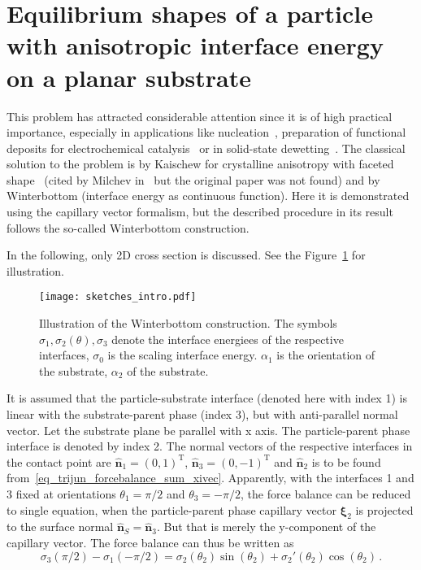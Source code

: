 \section{Equilibrium shapes of a particle with anisotropic interface energy on a planar substrate}
This problem has attracted considerable attention since it is of high practical importance, especially in applications like nucleation~\cite{Bormashenko2021}, preparation of functional deposits for electrochemical catalysis~\cite{Tian2007} or in solid-state dewetting~\cite{PierreLuis2016, Bao2017}. The classical solution to the problem is by Kaischew for crystalline anisotropy with faceted shape~\cite{Kaischew1951} (cited by Milchev in~\cite{Milchev2002} but the original paper was not found) and by Winterbottom \cite{Winterbottom1967} (interface energy as continuous function). Here it is demonstrated using the capillary vector formalism, but the described procedure in its result follows the so-called Winterbottom construction. 

In the following, only 2D cross section is discussed. See the Figure~\ref{fig_winterbottom_explained_intro} for illustration.
\begin{figure}
	\centering
	\texttt{[image: sketches\_intro.pdf]}
	\caption{Illustration of the Winterbottom construction. The symbols $\sigma_1, \sigma_2(\theta), \sigma_3$ denote the interface energiees of the respective interfaces, $\sigma_0$ is the scaling interface energy.  $\alpha_1$ is the orientation of the substrate, $\alpha_2$ of the substrate.}
	\label{fig_winterbottom_explained_intro}
\end{figure}
 It is assumed that the particle-substrate interface (denoted here with index 1) is linear with the substrate-parent phase (index 3), but with anti-parallel normal vector. Let the substrate plane be parallel with x axis. The particle-parent phase interface is denoted by index 2. The normal vectors of the respective interfaces in the contact point are $\hat{\bm{n}}_1=(0,1)^{\mathrm{T}}$, $\hat{\bm{n}}_3=(0,-1)^{\mathrm{T}}$ and $\hat{\bm{n}}_2$ is to be found from~\eqref{eq_trijun_forcebalance_sum_xivec}. Apparently, with the interfaces 1 and 3 fixed at orientations $\theta_1=\pi/2$ and $\theta_3=-\pi/2$, the force balance can be reduced to single equation, when the particle-parent phase capillary vector $\bm{\xi}_2$ is projected to the surface normal $\hat{\bm{n}}_S=\hat{\bm{n}}_3$. But that is merely the y-component of the capillary vector. The force balance can thus be written as
\begin{equation}\label{eq_youngs_eq_aniso}
    \sigma_{3}(\pi/2)-\sigma_1(-\pi/2)  
      = \sigma_2(\theta_2)\sin(\theta_2) + \sigma_2'(\theta_2)\cos(\theta_2) \,.
\end{equation}

